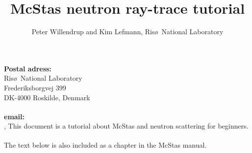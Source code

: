 \documentclass[a4paper]{article}
\title{McStas neutron ray-trace tutorial}
\author{Peter Willendrup and Kim Lefmann, Ris\o\ National Laboratory}
\begin{document}
\maketitle
{\noindent \small {\bf Postal adress:}\\
Ris\o\ National Laboratory\\Frederiksborgvej 399\\DK-4000
  Roskilde, Denmark\\\ \\{\bf
    email:}\\,}
\abstract \noindent This document is a tutorial about McStas and
neutron scattering for beginners.\\\ 
\\The text below is also included as a chapter in the McStas manual.

\end{document}

